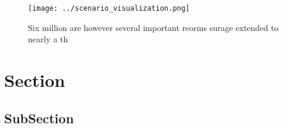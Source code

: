 \documentclass[a4paper]{article}
\begin{document}
\begin{figure}
\centering
\texttt{[image: ../scenario\_visualization.png]}
\caption{Six million are however several important reorms surage extended to nearly a th
}
\end{figure}
 
\section{Section}

\subsection{SubSection}
\end{document}
